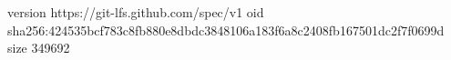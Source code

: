 version https://git-lfs.github.com/spec/v1
oid sha256:424535bcf783c8fb880e8dbdc3848106a183f6a8c2408fb167501dc2f7f0699d
size 349692
